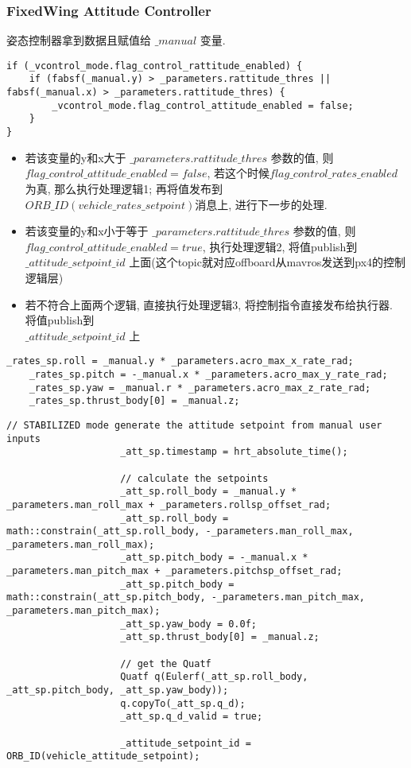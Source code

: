 \subsubsection{FixedWing Attitude Controller}
姿态控制器拿到数据且赋值给 $\_manual$ 变量.
\begin{lstlisting}[title=高度处理逻辑]
if (_vcontrol_mode.flag_control_rattitude_enabled) {
	if (fabsf(_manual.y) > _parameters.rattitude_thres || fabsf(_manual.x) > _parameters.rattitude_thres) {
		_vcontrol_mode.flag_control_attitude_enabled = false;
	}
}
\end{lstlisting}
\par
\begin{itemize}
    \item 若该变量的y和x大于 $\_parameters.rattitude\_thres$ 参数的值, 则 $flag\_control\_attitude\_enabled = false$, 若这个时候$flag\_control\_rates\_enabled$ 为真, 那么执行处理逻辑1; 再将值发布到\\$ORB\_ID(vehicle\_rates\_setpoint)$消息上, 进行下一步的处理.
    \item 若该变量的y和x小于等于 $\_parameters.rattitude\_thres$ 参数的值, 则 $flag\_control\_attitude\_enabled = true$, 执行处理逻辑2, 将值publish到 $\_attitude\_setpoint\_id$ 上面(这个topic就对应offboard从mavros发送到px4的控制逻辑层)
    \item 若不符合上面两个逻辑, 直接执行处理逻辑3, 将控制指令直接发布给执行器. 将值publish到 \\ $\_attitude\_setpoint\_id$ 上
\end{itemize}
\begin{lstlisting}[title=处理逻辑1]  
    _rates_sp.roll = _manual.y * _parameters.acro_max_x_rate_rad;
    _rates_sp.pitch = -_manual.x * _parameters.acro_max_y_rate_rad;
    _rates_sp.yaw = _manual.r * _parameters.acro_max_z_rate_rad;
    _rates_sp.thrust_body[0] = _manual.z;        
\end{lstlisting}
\begin{lstlisting}[title=处理逻辑2]  
    // STABILIZED mode generate the attitude setpoint from manual user inputs
					_att_sp.timestamp = hrt_absolute_time();

					// calculate the setpoints 
					_att_sp.roll_body = _manual.y * _parameters.man_roll_max + _parameters.rollsp_offset_rad;
					_att_sp.roll_body = math::constrain(_att_sp.roll_body, -_parameters.man_roll_max, _parameters.man_roll_max);
					_att_sp.pitch_body = -_manual.x * _parameters.man_pitch_max + _parameters.pitchsp_offset_rad;
					_att_sp.pitch_body = math::constrain(_att_sp.pitch_body, -_parameters.man_pitch_max, _parameters.man_pitch_max);
					_att_sp.yaw_body = 0.0f;
					_att_sp.thrust_body[0] = _manual.z;

					// get the Quatf
					Quatf q(Eulerf(_att_sp.roll_body, _att_sp.pitch_body, _att_sp.yaw_body));
					q.copyTo(_att_sp.q_d);
                    _att_sp.q_d_valid = true;  
                    
                    _attitude_setpoint_id = ORB_ID(vehicle_attitude_setpoint);
\end{lstlisting}
